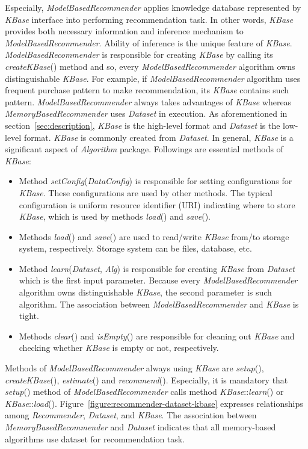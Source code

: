 \documentclass[a4paper,twoside]{article}
\begin{document}
Especially, \textit{ModelBasedRecommender} applies knowledge database represented by \textit{KBase} interface into performing recommendation task. In other words, \textit{KBase} provides both necessary information and inference mechanism to \textit{ModelBasedRecommender}. Ability of inference is the unique feature of \textit{KBase}. \textit{ModelBasedRecommender} is responsible for creating \textit{KBase} by calling its \textit{createKBase}() method and so, every \textit{ModelBasedRecommender} algorithm owns distinguishable \textit{KBase}. For example, if \textit{ModelBasedRecommender} algorithm uses frequent purchase pattern to make recommendation, its \textit{KBase} contains such pattern. \textit{ModelBasedRecommender} always takes advantages of \textit{KBase} whereas \textit{MemoryBasedRecommender} uses \textit{Dataset} in execution. As aforementioned in section~\ref{sec:description}, \textit{KBase} is the high-level format and \textit{Dataset} is the low-level format. \textit{KBase} is commonly created from \textit{Dataset}. In general, \textit{KBase} is a significant aspect of \textit{Algorithm} package. Followings are essential methods of \textit{KBase}:
\begin{itemize}
\item Method \textit{setConfig}(\textit{DataConfig}) is responsible for setting configurations for \textit{KBase}. These configurations are used by other methods. The typical configuration is uniform resource identifier (URI) indicating where to store \textit{KBase}, which is used by methods \textit{load}() and \textit{save}().
\item Methods \textit{load}() and \textit{save}() are used to read/write \textit{KBase} from/to storage system, respectively. Storage system can be files, database, etc.
\item Method \textit{learn}(\textit{Dataset}, \textit{Alg}) is responsible for creating \textit{KBase} from \textit{Dataset} which is the first input parameter. Because every \textit{ModelBasedRecommender} algorithm owns distinguishable \textit{KBase}, the second parameter is such algorithm. The association between \textit{ModelBasedRecommender} and \textit{KBase} is tight.
\item Methods \textit{clear}() and \textit{isEmpty}() are responsible for cleaning out \textit{KBase} and checking whether \textit{KBase} is empty or not, respectively.
\end{itemize}
Methods of \textit{ModelBasedRecommender} always using \textit{KBase} are \textit{setup}(), \textit{createKBase}(), \textit{estimate}() and \textit{recommend}(). Especially, it is mandatory that \textit{setup}() method of \textit{ModelBasedRecommender} calls method \textit{KBase}::\textit{learn}() or \textit{KBase}::\textit{load}(). Figure~\ref{figure:recommender-dataset-kbase} expresses relationships among \textit{Recommender}, \textit{Dataset}, and \textit{KBase}. The association between \textit{MemoryBasedRecommender} and \textit{Dataset} indicates that all memory-based algorithms use dataset for recommendation task.
\end{document}
